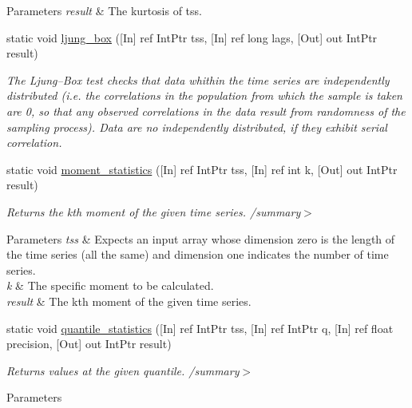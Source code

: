 \begin{DoxyCompactItemize}
\begin{DoxyCompactList}
\begin{DoxyParams}{Parameters}
\hline
{\em result} & The kurtosis of tss.\\
\hline
\end{DoxyParams}
\end{DoxyCompactList}\item 
static void \mbox{\hyperlink{classkhiva_1_1interop_1_1_d_l_l_statistics_a3af99a17a16f48d5d0914d69101385cf}{ljung\+\_\+box}} (\mbox{[}In\mbox{]} ref Int\+Ptr tss, \mbox{[}In\mbox{]} ref long lags, \mbox{[}Out\mbox{]} out Int\+Ptr result)
\begin{DoxyCompactList}\small\item\em The Ljung–\+Box test checks that data whithin the time series are independently distributed (i.\+e. the correlations in the population from which the sample is taken are 0, so that any observed correlations in the data result from randomness of the sampling process). Data are no independently distributed, if they exhibit serial correlation. \end{DoxyCompactList}\item 
static void \mbox{\hyperlink{classkhiva_1_1interop_1_1_d_l_l_statistics_ab849e99c88eed74f40ae62268d7a42c2}{moment\+\_\+statistics}} (\mbox{[}In\mbox{]} ref Int\+Ptr tss, \mbox{[}In\mbox{]} ref int k, \mbox{[}Out\mbox{]} out Int\+Ptr result)
\begin{DoxyCompactList}\small\item\em Returns the kth moment of the given time series. /summary$>$ 
\begin{DoxyParams}{Parameters}
{\em tss} & Expects an input array whose dimension zero is the length of the time series (all the same) and dimension one indicates the number of time series.\\
\hline
{\em k} & The specific moment to be calculated.\\
\hline
{\em result} & The kth moment of the given time series.\\
\hline
\end{DoxyParams}
\end{DoxyCompactList}\item 
static void \mbox{\hyperlink{classkhiva_1_1interop_1_1_d_l_l_statistics_a05326ea4529905b6d75bd79c64c0c4a1}{quantile\+\_\+statistics}} (\mbox{[}In\mbox{]} ref Int\+Ptr tss, \mbox{[}In\mbox{]} ref Int\+Ptr q, \mbox{[}In\mbox{]} ref float precision, \mbox{[}Out\mbox{]} out Int\+Ptr result)
\begin{DoxyCompactList}\small\item\em Returns values at the given quantile. /summary$>$ 
\begin{DoxyParams}{Parameters}

\end{DoxyParams}
\end{DoxyCompactList}
\end{DoxyCompactItemize}
